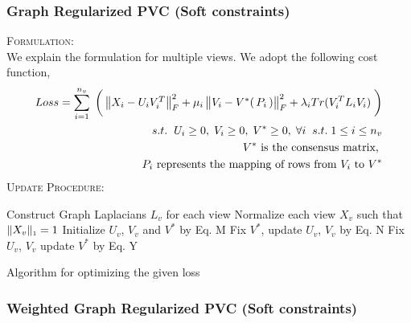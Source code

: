 \documentclass[a4paper]{article}
\begin{document}
	\subsubsection{Graph Regularized PVC (Soft constraints)}
	
	\textsc{Formulation:}\\
	We explain the formulation for multiple views. We adopt the following cost function,
	\begin{align*}	
	Loss = \displaystyle\sum_{i=1}^{n_{v}} \; \bigg(\begin{Vmatrix} X_{i}-U_{i}V^{T}_{i} \end{Vmatrix}^{2}_{F}	
		+ \mu_{i}\begin{Vmatrix} V_{i}-V^{*}(\, P_{i} \, ) \end{Vmatrix}^{2}_{F}
		+ \lambda_{i}Tr(V^{T}_{i}L_{i}V_{i}) \; \bigg)\\	
		s.t. \hspace{2mm}  U_{i}\geq0,\;V_{i}\geq0,\;V^{*}\geq0,\;\forall i \;\;s.t.\; 1 \leq i \leq n_{v}\\
		V^{*} \text{ is the consensus matrix, } \\
		P_{i} \text{ represents the mapping of rows from } V_{i} \text{ to } V^{*}
	\end{align*}	
	\textsc{Update Procedure:}
	
	\begin{algorithm}
		Construct Graph Laplacians $L_{v}$ for each view\;
		Normalize each view $X_{v}$ such that $\|X_{v}\|_{\text{\tiny1}} = 1 $\;
		Initialize  $U_{v}$, $V_{v}$ and $V^{*}$ by Eq. M\;
		{
			{
				{
					Fix $V^{*}$, update $U_{v}$, $V_{v}$ by Eq. N\;
				}
			}
			Fix $U_{v}$, $V_{v}$ update $V^{*}$ by Eq. Y\;		
		}						
		\caption{Algorithm for optimizing the given loss}
	\end{algorithm}


	\subsubsection{Weighted Graph Regularized PVC (Soft constraints)}
	
\end{document}
